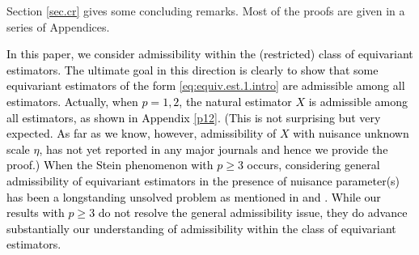 \documentclass[preprint,11pt]{imsart}
\numberwithin{equation}{section}
\theoremstyle{plain}
\theoremstyle{definition}
\theoremstyle{remark}
\newcommand{\AKA}[1]{\textcolor{black}{#1}}
\begin{document}
Section \ref{sec.cr} gives some concluding remarks.
Most of the proofs are given in a series of Appendices.

\AKA{In this paper, we consider admissibility within the (restricted) class of
equivariant estimators.
The ultimate goal in this direction is clearly to show that some equivariant 
estimators of the form \eqref{eq:equiv.est.1.intro} are admissible among
all estimators. Actually, when $p=1,2$, the natural estimator $X$ is admissible
among all estimators, as shown in Appendix \ref{p12}.
(This is not surprising but very expected. 
As far as we know, however, admissibility of $X$ with nuisance unknown scale $\eta$, has not yet
reported in any major journals and hence we provide the proof.)
When the Stein phenomenon with $p\geq 3$ occurs,
considering general admissibility of equivariant estimators
in the presence of nuisance parameter(s) has been a longstanding unsolved
problem as mentioned in \cite{James-Stein-1961} and \cite{Brewster-Zidek-1974}.
While our results with $p\geq 3$ do not resolve the general admissibility issue,
they do advance substantially our understanding of admissibility within the class
of equivariant estimators.}
\end{document}
